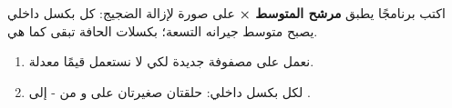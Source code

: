 \begin{statement}
اكتب برنامجًا يطبق \textbf{مرشح المتوسط ×} على صورة  لإزالة الضجيج: كل بكسل داخلي يصبح متوسط جيرانه التسعة؛ بكسلات الحافة تبقى كما هي.
\end{statement}
\begin{stepsbox}\begin{enumerate}
\item نعمل على مصفوفة جديدة  لكي لا نستعمل قيمًا معدلة.
\item لكل بكسل داخلي: حلقتان صغيرتان على  و من - إلى .
\end{enumerate}\end{stepsbox}
